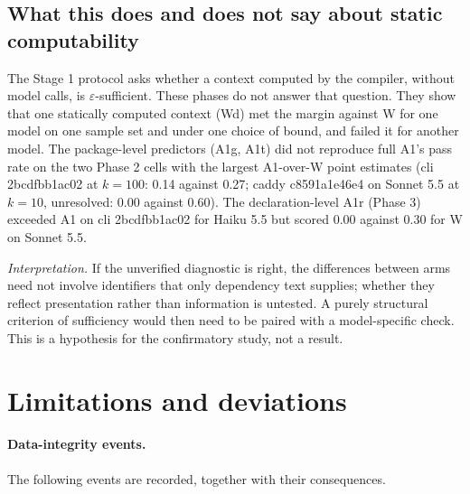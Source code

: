 \documentclass[10pt]{article}
\newcommand{\eps}{\varepsilon}
\begin{document}
\subsection{What this does and does not say about static computability}

The Stage 1 protocol asks whether a context computed by the compiler, without model calls, is $\eps$-sufficient. These phases do not answer that question. They show that one statically computed context (Wd) met the margin against W for one model on one sample set and under one choice of bound, and failed it for another model. The package-level predictors (A1g, A1t) did not reproduce full A1's pass rate on the two Phase 2 cells with the largest A1-over-W point estimates (cli 2bcdfbb1ac02 at $k=100$: 0.14 against 0.27; caddy c8591a1e46e4 on Sonnet 5.5 at $k=10$, unresolved: 0.00 against 0.60). The declaration-level A1r (Phase 3) exceeded A1 on cli 2bcdfbb1ac02 for Haiku 5.5 but scored 0.00 against 0.30 for W on Sonnet 5.5.

\emph{Interpretation.} If the unverified diagnostic is right, the differences between arms need not involve identifiers that only dependency text supplies; whether they reflect presentation rather than information is untested. A purely structural criterion of sufficiency would then need to be paired with a model-specific check. This is a hypothesis for the confirmatory study, not a result.

\section{Limitations and deviations}\label{sec:lim}

\paragraph{Data-integrity events.} The following events are recorded, together with their consequences.
\end{document}

